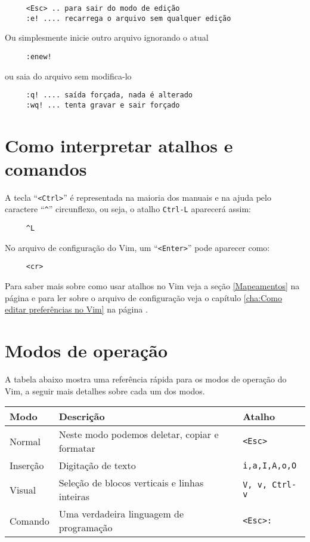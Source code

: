 \begin{verbatim}
     <Esc> .. para sair do modo de edição
     :e! .... recarrega o arquivo sem qualquer edição
\end{verbatim}

Ou simplesmente inicie outro arquivo ignorando o atual

\begin{verbatim}
     :enew!
\end{verbatim}

ou saia do arquivo sem modifica-lo

\begin{verbatim}
     :q! .... saída forçada, nada é alterado
     :wq! ... tenta gravar e sair forçado
\end{verbatim}

\section{Como interpretar atalhos e comandos}\label{Como interpretar atalhos e comandos}

A tecla ``\verb|<Ctrl>|'' é representada na maioria dos manuais e na ajuda
pelo caractere ``\verb|^|'' circunflexo, ou seja, o atalho \verb|Ctrl-L| aparecerá assim:

\begin{verbatim}
     ^L
\end{verbatim}

No arquivo de configuração do Vim, um ``\verb|<Enter>|'' pode aparecer como:

\begin{verbatim}
     <cr>
\end{verbatim}

Para saber mais sobre como usar atalhos no Vim veja a seção \ref{Mapeamentos}
na página \pageref{Mapeamentos} e para ler sobre o arquivo de configuração veja
o capítulo \ref{cha:Como editar preferências no Vim} na página
\pageref{cha:Como editar preferências no Vim}.


\section{Modos de operação}\label{Modos de operação}

A tabela abaixo mostra uma referência rápida para os modos de operação do Vim,
a seguir mais detalhes sobre cada um dos modos. \newline

\begin{tabular}{|l|l|l|}
\hline
\textbf{Modo} & \textbf{Descrição} & \textbf{Atalho} \tabularnewline
\hline \hline
Normal & Neste modo podemos deletar, copiar e formatar & {\tt <Esc>}\tabularnewline
\hline
Inserção & Digitação de texto & {}{\tt i,a,I,A,o,O}\tabularnewline
\hline
Visual & Seleção de blocos verticais e linhas inteiras & {}{\tt V, v, Ctrl-v} \tabularnewline
\hline
Comando & Uma verdadeira linguagem de programação & {}{\tt <Esc>:}\tabularnewline
\hline
\end{tabular}


